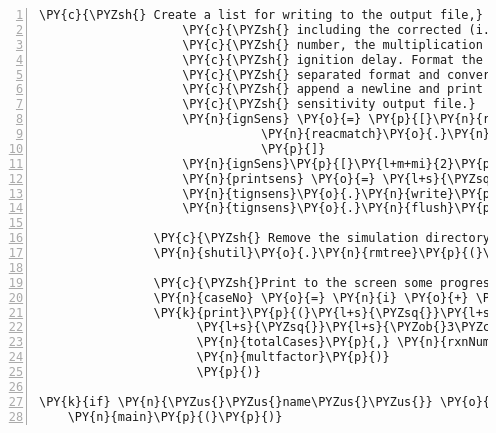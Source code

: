 \begin{Verbatim}[commandchars=\\\{\},fontsize=\small,numbers=left,firstnumber=1,stepnumber=2,firstline=2]
                    \PY{c}{\PYZsh{} Create a list for writing to the output file,}
                    \PY{c}{\PYZsh{} including the corrected (i.e. one\PYZhy{}based) reaction}
                    \PY{c}{\PYZsh{} number, the multiplication factor, and the}
                    \PY{c}{\PYZsh{} ignition delay. Format the list into a comma\PYZhy{}}
                    \PY{c}{\PYZsh{} separated format and convert to a string. Then}
                    \PY{c}{\PYZsh{} append a newline and print the list to the}
                    \PY{c}{\PYZsh{} sensitivity output file.}
                    \PY{n}{ignSens} \PY{o}{=} \PY{p}{[}\PY{n}{rxnNum} \PY{o}{+} \PY{l+m+mi}{1}\PY{p}{,} \PY{n}{multfactor}\PY{p}{,}\PY{l+s}{\PYZsq{}}\PY{l+s}{\PYZsq{}}\PY{p}{,}\PY{l+s}{\PYZsq{}}\PY{l+s}{\PYZsq{}}\PY{p}{,}
                               \PY{n}{reacmatch}\PY{o}{.}\PY{n}{search}\PY{p}{(}\PY{n}{line}\PY{p}{)}\PY{o}{.}\PY{n}{group}\PY{p}{(}\PY{l+m+mi}{1}\PY{p}{)}\PY{o}{.}\PY{n}{strip}\PY{p}{(}\PY{p}{)}
                               \PY{p}{]}
                    \PY{n}{ignSens}\PY{p}{[}\PY{l+m+mi}{2}\PY{p}{:}\PY{l+m+mi}{2}\PY{p}{]} \PY{o}{=} \PY{n}{ignDelay}
                    \PY{n}{printsens} \PY{o}{=} \PY{l+s}{\PYZsq{}}\PY{l+s}{,}\PY{l+s}{\PYZsq{}}\PY{o}{.}\PY{n}{join}\PY{p}{(}\PY{n+nb}{map}\PY{p}{(}\PY{n+nb}{str}\PY{p}{,} \PY{n}{ignSens}\PY{p}{)}\PY{p}{)}
                    \PY{n}{tignsens}\PY{o}{.}\PY{n}{write}\PY{p}{(}\PY{n}{printsens} \PY{o}{+} \PY{l+s}{\PYZsq{}}\PY{l+s+se}{\PYZbs{}n}\PY{l+s}{\PYZsq{}}\PY{p}{)}
                    \PY{n}{tignsens}\PY{o}{.}\PY{n}{flush}\PY{p}{(}\PY{p}{)}

                \PY{c}{\PYZsh{} Remove the simulation directory.}
                \PY{n}{shutil}\PY{o}{.}\PY{n}{rmtree}\PY{p}{(}\PY{n}{chemfolder}\PY{p}{)}

                \PY{c}{\PYZsh{}Print to the screen some progress information.}
                \PY{n}{caseNo} \PY{o}{=} \PY{n}{i} \PY{o}{+} \PY{l+m+mi}{1} \PY{o}{+} \PY{n}{j}\PY{o}{*}\PY{n+nb}{len}\PY{p}{(}\PY{n}{wantreactions}\PY{p}{)}
                \PY{k}{print}\PY{p}{(}\PY{l+s}{\PYZsq{}}\PY{l+s}{Case \PYZob{}0\PYZcb{} of \PYZob{}1\PYZcb{} }\PY{l+s+se}{\PYZbs{}n}\PY{l+s}{Reaction \PYZsh{}: \PYZob{}2\PYZcb{} }\PY{l+s+se}{\PYZbs{}n}\PY{l+s}{Ignition Delay:}\PY{l+s}{\PYZsq{}}
                      \PY{l+s}{\PYZsq{}}\PY{l+s}{\PYZob{}3\PYZcb{}}\PY{l+s+se}{\PYZbs{}n}\PY{l+s}{Input File: \PYZob{}4\PYZcb{}}\PY{l+s+se}{\PYZbs{}n}\PY{l+s}{Factor: \PYZob{}5\PYZcb{}}\PY{l+s}{\PYZsq{}}\PY{o}{.}\PY{n}{format}\PY{p}{(}\PY{n}{caseNo}\PY{p}{,}
                      \PY{n}{totalCases}\PY{p}{,} \PY{n}{rxnNum} \PY{o}{+} \PY{l+m+mi}{1}\PY{p}{,} \PY{n}{ignDelay}\PY{p}{,} \PY{n}{inpfile}\PY{p}{,}
                      \PY{n}{multfactor}\PY{p}{)}
                      \PY{p}{)}

\PY{k}{if} \PY{n}{\PYZus{}\PYZus{}name\PYZus{}\PYZus{}} \PY{o}{==} \PY{l+s}{\PYZsq{}}\PY{l+s}{\PYZus{}\PYZus{}main\PYZus{}\PYZus{}}\PY{l+s}{\PYZsq{}}\PY{p}{:}
    \PY{n}{main}\PY{p}{(}\PY{p}{)}
\end{Verbatim}
